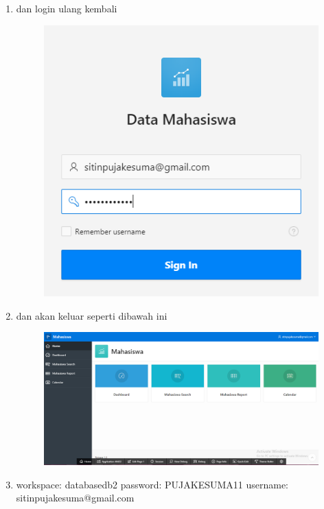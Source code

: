 \begin{enumerate}
	\item dan login ulang kembali 
	\begin{figure} [!htbp]
	\includegraphics[scale=0.2]{Apex/28.png}
	\centering
	\end{figure}
	
	\item dan akan keluar seperti dibawah ini
	\begin{figure} [!htbp]
	\includegraphics[scale=0.2]{Apex/292.png}
	\centering
	\end{figure}
	
	\item workspace: databasedb2
	password: PUJAKESUMA11
	username: sitinpujakesuma@gmail.com	
	
\end{enumerate}
